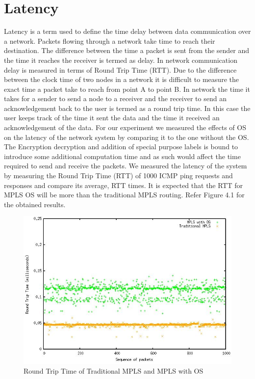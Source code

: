 \section{Latency}
    Latency is a term used to define the time delay between data communication over a network. Packets flowing through a network take time to reach their destination. The difference between the time a packet is sent from the sender and the time it reaches the receiver is termed as delay. In network communication delay is measured in terms of Round Trip Time (RTT). Due to the difference between the clock time of two nodes in a network it is difficult to measure the exact time a packet take to reach from point A to point B. In network the time it takes for a sender to send a node to a receiver and the receiver to send an acknowledgement back to the user is termed as a round trip time. In this case the user keeps track of the time it sent the data and the time it received an acknowledgement of the data.
    For our experiment we measured the effects of OS on the latency of the network system by comparing it to the one without the OS. The Encryption decryption and addition of special purpose labels is bound to introduce some additional computation time and as such would affect the time required to send and receive the packets. We measured the latency of the system by measuring the Round Trip Time (RTT) of 1000 ICMP ping requests and responses and compare its average, RTT times. It is expected that the RTT for MPLS OS will be more than the traditional MPLS routing. Refer Figure 4.1 for the obtained results.
    \begin{figure}[H]
       \centering\includegraphics[width=\textwidth]{images/17_MPLSvsOS.JPG}
       \caption{Round Trip Time of Traditional MPLS and MPLS with OS}
       \label{fig:compbest}
\end{figure}
